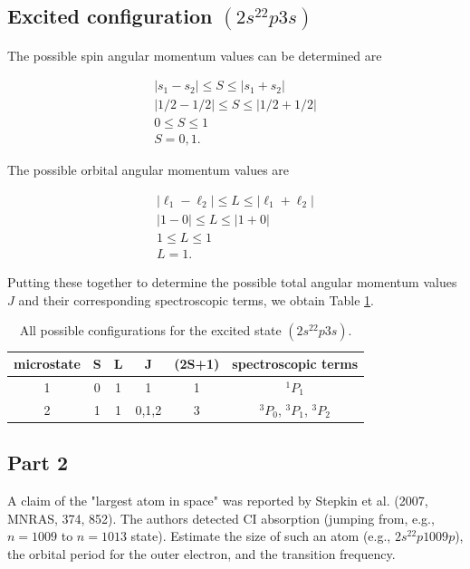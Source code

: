\documentclass[12pt]{article}
\begin{document}
\subsection*{Excited configuration $(2s^22p3s)$}

The possible spin angular momentum values can be determined are

\begin{align*}
|s_1 - s_2| \leq S \leq |s_1 + s_2| \\
|1/2 - 1/2| \leq S \leq |1/2 + 1/2| \\
0 \leq S \leq 1 \\
S = 0, 1.
\end{align*}

The possible orbital angular momentum values are

\begin{align*}
|\ell_1 - \ell_2| \leq L \leq |\ell_1 + \ell_2| \\
|1 - 0| \leq L \leq |1 + 0| \\
1 \leq L \leq 1 \\
L = 1.
\end{align*}

Putting these together to determine the possible total angular momentum values $J$ and their corresponding spectroscopic terms, we obtain Table \ref{table:config3_table1}.

\begin{table}[ht]
\centering
\caption{All possible configurations for the excited state $(2s^22p3s)$.}
\label{table:config3_table1}
\begin{tabular}{|c|cccc|c|}
\hline
microstate & S & L & J & (2S+1) & spectroscopic terms \\
\hline
1 & 0 & 1 & 1      & 1 & $^1P_1$ \\
2 & 1 & 1 & 0,1,2  & 3 & $^3P_0$, $^3P_1$, $^3P_2$ \\

\hline
\end{tabular}
\end{table}


\subsection*{Part 2}

A claim of the "largest atom in space" was reported by Stepkin et al. (2007, MNRAS, 374, 852). The authors detected $\mathrm{CI}$ absorption (jumping from, e.g., $n=1009$ to $n=1013$ state). Estimate the size of such an atom (e.g., $2s^22p1009p$), the orbital period for the outer electron, and the transition frequency.
\end{document}
